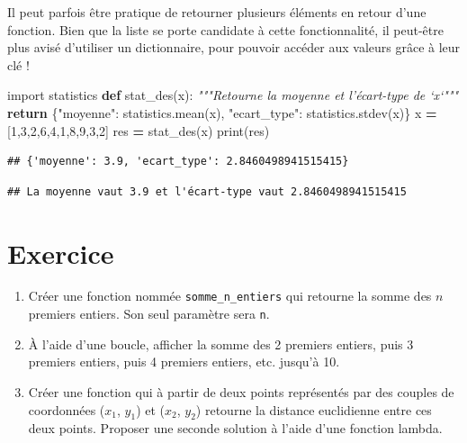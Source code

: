 \documentclass[12pt,]{book}
\newenvironment{Shaded}{\begin{snugshade}}{\end{snugshade}}
\newcommand{\KeywordTok}[1]{\textcolor[rgb]{0.13,0.29,0.53}{\textbf{#1}}}
\newcommand{\DecValTok}[1]{\textcolor[rgb]{0.00,0.00,0.81}{#1}}
\newcommand{\SpecialCharTok}[1]{\textcolor[rgb]{0.00,0.00,0.00}{#1}}
\newcommand{\StringTok}[1]{\textcolor[rgb]{0.31,0.60,0.02}{#1}}
\newcommand{\ImportTok}[1]{#1}
\newcommand{\CommentTok}[1]{\textcolor[rgb]{0.56,0.35,0.01}{\textit{#1}}}
\newcommand{\ControlFlowTok}[1]{\textcolor[rgb]{0.13,0.29,0.53}{\textbf{#1}}}
\newcommand{\OperatorTok}[1]{\textcolor[rgb]{0.81,0.36,0.00}{\textbf{#1}}}
\newcommand{\BuiltInTok}[1]{#1}
\newcommand{\NormalTok}[1]{#1}
\providecommand{\tightlist}{%
  \setlength{\itemsep}{0pt}\setlength{\parskip}{0pt}}
\numberwithin{equation}{section}
\numberwithin{countremarque}{section}
\let\BeginKnitrBlock\begin \let\EndKnitrBlock\end
\begin{document}
Il peut parfois être pratique de retourner plusieurs éléments en retour
d'une fonction. Bien que la liste se porte candidate à cette
fonctionnalité, il peut-être plus avisé d'utiliser un dictionnaire, pour
pouvoir accéder aux valeurs grâce à leur clé !

\begin{Shaded}
\begin{Highlighting}[]
\ImportTok{import}\NormalTok{ statistics}
\KeywordTok{def}\NormalTok{ stat_des(x):}
  \CommentTok{"""Retourne la moyenne et l'écart-type de `x`"""}
  \ControlFlowTok{return}\NormalTok{ \{}\StringTok{"moyenne"}\NormalTok{: statistics.mean(x),}
  \StringTok{"ecart_type"}\NormalTok{: statistics.stdev(x)\}}
\NormalTok{x }\OperatorTok{=}\NormalTok{ [}\DecValTok{1}\NormalTok{,}\DecValTok{3}\NormalTok{,}\DecValTok{2}\NormalTok{,}\DecValTok{6}\NormalTok{,}\DecValTok{4}\NormalTok{,}\DecValTok{1}\NormalTok{,}\DecValTok{8}\NormalTok{,}\DecValTok{9}\NormalTok{,}\DecValTok{3}\NormalTok{,}\DecValTok{2}\NormalTok{]}
\NormalTok{res }\OperatorTok{=}\NormalTok{ stat_des(x)}
\BuiltInTok{print}\NormalTok{(res)}
\end{Highlighting}
\end{Shaded}

\begin{lstlisting}
## {'moyenne': 3.9, 'ecart_type': 2.8460498941515415}
\end{lstlisting}

\begin{Shaded}
\end{Shaded}

\begin{lstlisting}
## La moyenne vaut 3.9 et l'écart-type vaut 2.8460498941515415
\end{lstlisting}

\section{Exercice}\label{exercice-6}

\BeginKnitrBlock{exframe}
\begin{enumerate}
\def\labelenumi{\arabic{enumi}.}
\tightlist
\item
  Créer une fonction nommée \texttt{somme\_n\_entiers} qui retourne la
  somme des \(n\) premiers entiers. Son seul paramètre sera \texttt{n}.
\item
  À l'aide d'une boucle, afficher la somme des 2 premiers entiers, puis
  3 premiers entiers, puis 4 premiers entiers, etc. jusqu'à 10.
\item
  Créer une fonction qui à partir de deux points représentés par des
  couples de coordonnées (\(x_1\), \(y_1\)) et (\(x_2\), \(y_2\))
  retourne la distance euclidienne entre ces deux points. Proposer une
  seconde solution à l'aide d'une fonction lambda.
\end{enumerate}
\EndKnitrBlock{exframe}
\end{document}
